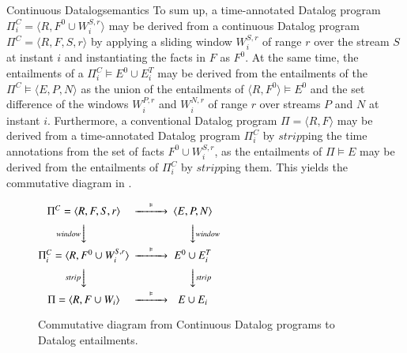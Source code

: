 \begin{nestedsection}{Continuous Datalog}{semantics}
To sum up, a time-annotated Datalog program
${\Pi^C_i = \langle R, F^0 \cup W^{S,r}_i \rangle}$ may be derived from
a continuous Datalog program ${\Pi^C = \langle R, F, S, r \rangle}$ by
applying a sliding window $W^{S,r}_i$ of range $r$ over the stream $S$ at
instant $i$ and instantiating the facts in $F$ as $F^0$. At the same time,
the entailments of a ${\Pi^C_i \vDash E^0 \cup E^T_i}$ may be derived from
the entailments of the ${\Pi^C \vDash \langle E, P, N \rangle}$ as the union
of the entailments of ${\langle R, F^0 \rangle \vDash E^0}$ and the set
difference of the windows $W^{P,r}_i$ and $W^{N,r}_i$ of range $r$ over
streams $P$ and $N$ at instant $i$.
Furthermore, a conventional Datalog program ${\Pi = \langle R, F \rangle}$
may be derived from a time-annotated Datalog program $\Pi^C_i$ by
${strip}$ping the time annotations from the set of facts
${F^0 \cup W^{S,r}_i}$, as the entailments of ${\Pi \vDash E}$ may be
derived from the entailments of $\Pi^C_i$ by $strip$ping them.
This yields the commutative diagram in .
\begin{figure}
\centering
$
\begin{CD}
	{\Pi^C = \langle R, F, S, r \rangle} @>\vDash>> {\langle E, P, N \rangle} \\
	@V{window}VV @VV{window}V \\
	{\Pi^C_i = \langle R, F^0 \cup W^{S,r}_i \rangle} @>\vDash>> {E^0 \cup E^T_i} \\
	@V{strip}VV @VV{strip}V \\
	{\Pi = \langle R, F \cup W_i \rangle} @>\vDash>> {E \cup E_i}
\end{CD}
$
\caption{Commutative diagram from Continuous Datalog programs to Datalog entailments.}
\end{figure}
\end{nestedsection}
